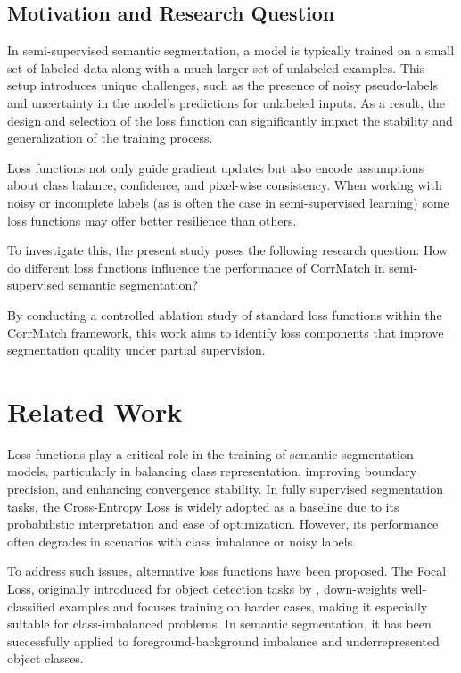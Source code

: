 \documentclass[10pt,twocolumn,letterpaper]{article}
\begin{document}
\subsection{Motivation and Research Question}
In semi-supervised semantic segmentation, a model is typically trained on a small set of labeled data along with a much larger set of unlabeled examples. This setup introduces unique challenges, such as the presence of noisy pseudo-labels and uncertainty in the model's predictions for unlabeled inputs. As a result, the design and selection of the loss function can significantly impact the stability and generalization of the training process.

Loss functions not only guide gradient updates but also encode assumptions about class balance, confidence, and pixel-wise consistency. When working with noisy or incomplete labels (as is often the case in semi-supervised learning) some loss functions may offer better resilience than others.

To investigate this, the present study poses the following research question: How do different loss functions influence the performance of CorrMatch in semi-supervised semantic segmentation?

By conducting a controlled ablation study of standard loss functions within the CorrMatch framework, this work aims to identify loss components that improve segmentation quality under partial supervision.

\section{Related Work}
Loss functions play a critical role in the training of semantic segmentation models, particularly in balancing class representation, improving boundary precision, and enhancing convergence stability. In fully supervised segmentation tasks, the Cross-Entropy Loss is widely adopted as a baseline due to its probabilistic interpretation and ease of optimization. However, its performance often degrades in scenarios with class imbalance or noisy labels.

To address such issues, alternative loss functions have been proposed. The Focal Loss, originally introduced for object detection tasks by \cite{lin2017focal}, down-weights well-classified examples and focuses training on harder cases, making it especially suitable for class-imbalanced problems. In semantic segmentation, it has been successfully applied to foreground-background imbalance and underrepresented object classes.
\end{document}
